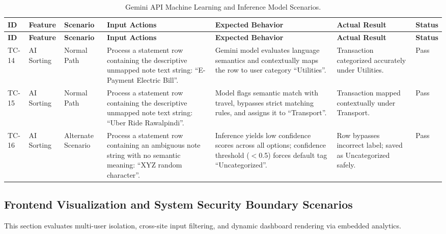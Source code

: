 \begingroup
\setlength{\tabcolsep}{3pt}
\renewcommand{\arraystretch}{1.3}
\begin{longtable}{|p{0.9cm}|>{\raggedright\arraybackslash}p{1.7cm}|>{\raggedright\arraybackslash}p{1.5cm}|>{\raggedright\arraybackslash}p{3.3cm}|>{\raggedright\arraybackslash}p{3.3cm}|>{\raggedright\arraybackslash}p{1.9cm}|>{\raggedright\arraybackslash}p{1.2cm}|}
	\caption{Gemini API Machine Learning and Inference Model Scenarios.}
	\label{tab:tc_ai}\\
	\hline
	\textbf{ID} & \textbf{Feature} & \textbf{Scenario} & \textbf{Input Actions} & \textbf{Expected Behavior} & \textbf{Actual Result} & \textbf{Status} \\ \hline
	\endfirsthead
	\hline
	\textbf{ID} & \textbf{Feature} & \textbf{Scenario} & \textbf{Input Actions} & \textbf{Expected Behavior} & \textbf{Actual Result} & \textbf{Status} \\ \hline
	\endhead
	TC-14 & AI Sorting & Normal Path & Process a statement row containing the descriptive unmapped note text string: ``E-Payment Electric Bill''. & Gemini model evaluates language semantics and contextually maps the row to user category ``Utilities''. & Transaction categorized accurately under Utilities. & Pass \\ \hline
	TC-15 & AI Sorting & Normal Path & Process a statement row containing the descriptive unmapped note text string: ``Uber Ride Rawalpindi''. & Model flags semantic match with travel, bypasses strict matching rules, and assigns it to ``Transport''. & Transaction mapped contextually under Transport. & Pass \\ \hline
	TC-16 & AI Sorting & Alternate Scenario & Process a statement row containing an ambiguous note string with no semantic meaning: ``XYZ random character''. & Inference yields low confidence scores across all options; confidence threshold ($<$0.5) forces default tag ``Uncategorized''. & Row bypasses incorrect label; saved as Uncategorized safely. & Pass \\ \hline
\end{longtable}
\endgroup

\subsection{Frontend Visualization and System Security Boundary Scenarios}
This section evaluates multi-user isolation, cross-site input filtering, and dynamic dashboard rendering via embedded analytics.

